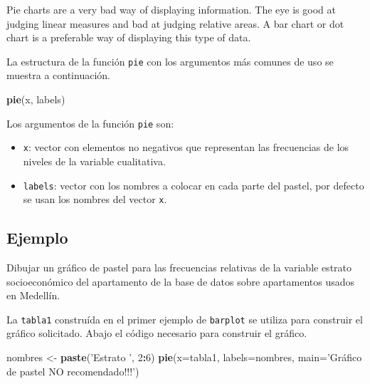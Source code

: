 \documentclass[10pt,]{krantz}
\makeatletter
\newenvironment{Shaded}{\begin{snugshade}}{\end{snugshade}}
\newcommand{\KeywordTok}[1]{\textcolor[rgb]{0.13,0.29,0.53}{\textbf{#1}}}
\newcommand{\DataTypeTok}[1]{\textcolor[rgb]{0.13,0.29,0.53}{#1}}
\newcommand{\DecValTok}[1]{\textcolor[rgb]{0.00,0.00,0.81}{#1}}
\newcommand{\StringTok}[1]{\textcolor[rgb]{0.31,0.60,0.02}{#1}}
\newcommand{\OperatorTok}[1]{\textcolor[rgb]{0.81,0.36,0.00}{\textbf{#1}}}
\newcommand{\NormalTok}[1]{#1}
\providecommand{\tightlist}{%
  \setlength{\itemsep}{0pt}\setlength{\parskip}{0pt}}
\newenvironment{kframe}{%
\medskip{}
\setlength{\fboxsep}{.8em}
 \def\at@end@of@kframe{}%
 \ifinner\ifhmode%
  \def\at@end@of@kframe{\end{minipage}}%
  \begin{minipage}{\columnwidth}%
 \fi\fi%
 \def\FrameCommand##1{\hskip\@totalleftmargin \hskip-\fboxsep
 \colorbox{shadecolor}{##1}\hskip-\fboxsep
     \hskip-\linewidth \hskip-\@totalleftmargin \hskip\columnwidth}%
 \MakeFramed {\advance\hsize-\width
   \@totalleftmargin\z@ \linewidth\hsize
   \@setminipage}}%
 {\par\unskip\endMakeFramed%
 \at@end@of@kframe}
\renewenvironment{Shaded}{\begin{kframe}}{\end{kframe}}
\let\BeginKnitrBlock\begin \let\EndKnitrBlock\end
\makeatother
\begin{document}
\BeginKnitrBlock{rmdwarning}
Pie charts are a very bad way of displaying information. The eye is good
at judging linear measures and bad at judging relative areas. A bar
chart or dot chart is a preferable way of displaying this type of data.
\EndKnitrBlock{rmdwarning}

La estructura de la función \texttt{pie} con los argumentos más comunes
de uso se muestra a continuación.

\begin{Shaded}
\begin{Highlighting}[]
\KeywordTok{pie}\NormalTok{(x, labels)}
\end{Highlighting}
\end{Shaded}

Los argumentos de la función \texttt{pie} son:

\begin{itemize}
\tightlist
\item
  \texttt{x}: vector con elementos no negativos que representan las
  frecuencias de los niveles de la variable cualitativa.
\item
  \texttt{labels}: vector con los nombres a colocar en cada parte del
  pastel, por defecto se usan los nombres del vector \texttt{x}.
\end{itemize}

\subsection*{Ejemplo}\label{ejemplo-30}


Dibujar un gráfico de pastel para las frecuencias relativas de la
variable estrato socioeconómico del apartamento de la base de datos
sobre apartamentos usados en Medellín.

La \texttt{tabla1} construída en el primer ejemplo de \texttt{barplot}
se utiliza para construir el gráfico solicitado. Abajo el código
necesario para construir el gráfico.

\begin{Shaded}
\begin{Highlighting}[]
\NormalTok{nombres <-}\StringTok{ }\KeywordTok{paste}\NormalTok{(}\StringTok{'Estrato '}\NormalTok{, }\DecValTok{2}\OperatorTok{:}\DecValTok{6}\NormalTok{)}
\KeywordTok{pie}\NormalTok{(}\DataTypeTok{x=}\NormalTok{tabla1, }\DataTypeTok{labels=}\NormalTok{nombres, }
    \DataTypeTok{main=}\StringTok{'Gráfico de pastel NO recomendado!!!'}\NormalTok{)}
\end{Highlighting}
\end{Shaded}
\end{document}
